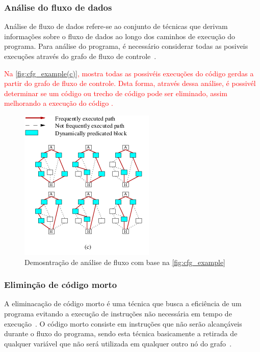 \subsubsection{Análise do fluxo de dados}
\par
Análise de fluxo de dados refere-se ao conjunto de técnicas que derivam informações sobre o fluxo de dados ao longo dos caminhos de execução do programa. Para análise do programa, é necessário considerar todas as posiveis execuções através do grafo de fluxo de controle~\cite{aho2007compilers}.

\par
\textcolor{red}{Na \autoref{fig:cfg_example(c)}, mostra todas as possivéis execuções do código gerdas a partir do grafo de fluxo de controle. Dsta forma, através dessa análise, é possivél determinar se um código ou trecho de código pode ser eliminado, assim melhorando a execução do código \cite{aho2007compilers}.}

\begin{figure}[H]
	\begin{center}
    \caption{\label{fig:cfg_example(c)}Demosntração de análise de fluxo com base na \autoref{fig:cfg_example}}
	\includegraphics[scale=0.85]{Figuras/cfg_example(c).png}
	\end{center}
\end{figure}
\subsubsection{Eliminção de código morto}

A eliminacação de código morto é uma técnica que busca a eficiência de um programa evitando a execução de instruções não necessária em tempo de execução~\cite{knoop1994partial}. O código morto consiste em instruções que não serão alcançáveis durante o fluxo do programa, sendo esta técnica basicamente a  retirada de qualquer variável que não será utilizada em qualquer outro nó do grafo~\cite{aho2007compilers}.

